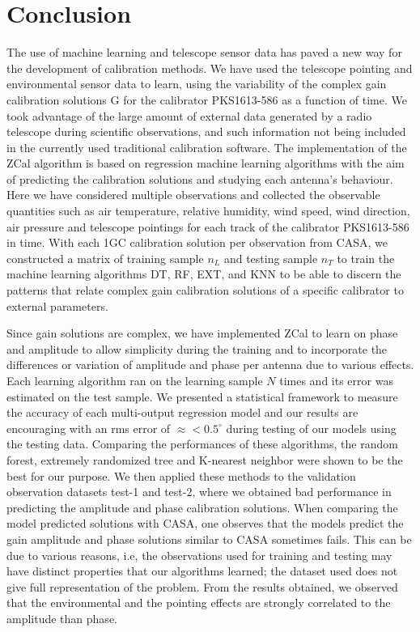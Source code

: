 \chapter{Conclusion}

The use of machine learning and telescope sensor data has paved a new way for the development of calibration methods. We have used the telescope pointing and environmental sensor data to learn, using the variability of the complex gain calibration solutions G for the calibrator PKS1613-586 as a function of time. We took advantage of the large amount of external data generated by a radio telescope during scientific observations, and such information not being included in the currently used traditional calibration software. The implementation of the ZCal algorithm is based on regression machine learning algorithms with the aim of predicting the calibration solutions and studying each antenna's behaviour. Here we have considered multiple observations and collected the observable quantities such as air temperature, relative humidity, wind speed, wind direction, air pressure and telescope pointings for each track of the calibrator PKS1613-586 in time. With each 1GC calibration solution per observation from CASA, we constructed a matrix of training sample $n_L$ and testing sample $n_T$ to train the machine learning algorithms DT, RF, EXT, and KNN to be able to discern the patterns that relate complex gain  calibration solutions of a specific calibrator to external parameters.       

Since gain solutions are complex, we have implemented  ZCal to learn on phase and amplitude to allow simplicity during the training and to incorporate the differences or variation of amplitude and phase per antenna due to various effects. Each learning algorithm ran on the learning sample $N$ times and its error was estimated on the test sample. We presented a statistical framework to measure the accuracy of each multi-output regression model and our results are encouraging with an rms error of $\approx < 0.5 ^\circ$ during testing of our models using the testing data. Comparing the performances of these algorithms, the random forest, extremely randomized tree and K-nearest neighbor were shown to be the best for our purpose. We then applied these methods to the validation observation datasets test-1 and test-2, where we obtained bad performance in predicting the amplitude and phase calibration solutions. When comparing the model predicted solutions with CASA, one observes that the models predict the gain amplitude and phase solutions similar to CASA sometimes fails. This can be due to various reasons, i.e, the observations used for training and testing may have distinct properties that our algorithms learned; the dataset used does not give full representation of the problem. From the results obtained, we observed that the environmental and the pointing effects are strongly correlated to the amplitude than phase. 

